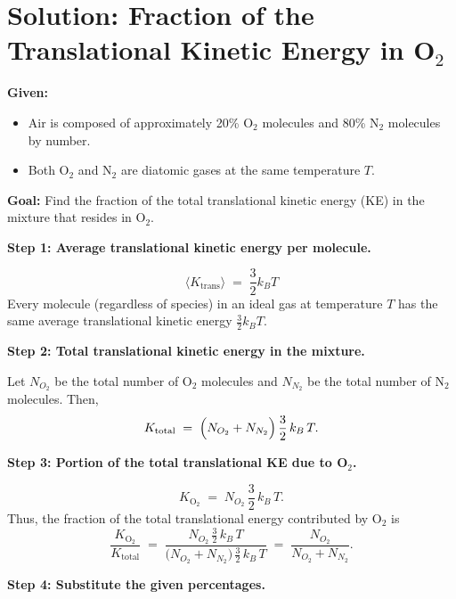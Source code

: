 \documentclass[12pt]{article}
\title{}
\author{Jerich Lee}
\date{\today}
\theoremstyle{definition} %
\theoremstyle{plain} %
\begin{document}
\maketitle

\section*{Solution: Fraction of the Translational Kinetic Energy in O$_2$}

\noindent
\textbf{Given:}
\begin{itemize}
    \item Air is composed of approximately 20\% O$_2$ molecules and 80\% N$_2$ molecules by number.
    \item Both O$_2$ and N$_2$ are diatomic gases at the same temperature $T$.
\end{itemize}

\noindent
\textbf{Goal:} Find the fraction of the total translational kinetic energy (KE) in the mixture that resides in O$_2$.

\vspace{1em}
\noindent
\textbf{Step 1: Average translational kinetic energy per molecule.}

\[
\langle K_\text{trans} \rangle \;=\; \frac{3}{2} k_B T
\]
Every molecule (regardless of species) in an ideal gas at temperature $T$ has the same average translational kinetic energy $\frac{3}{2} k_B T$.

\vspace{1em}
\noindent
\textbf{Step 2: Total translational kinetic energy in the mixture.}

Let $N_{O_2}$ be the total number of O$_2$ molecules and $N_{N_2}$ be the total number of N$_2$ molecules. Then,
\[
K_\text{total} \;=\; \Bigl(N_{O_2} + N_{N_2}\Bigr)\,\frac{3}{2}\,k_B\,T.
\]

\vspace{1em}
\noindent
\textbf{Step 3: Portion of the total translational KE due to O$_2$.}

\[
K_\text{O$_2$} \;=\; N_{O_2}\,\frac{3}{2}\,k_B\,T.
\]
Thus, the fraction of the total translational energy contributed by O$_2$ is
\[
\frac{K_\text{O$_2$}}{K_\text{total}} 
\;=\; 
\frac{N_{O_2}\,\frac{3}{2}\,k_B\,T}{\bigl(N_{O_2} + N_{N_2}\bigr)\,\frac{3}{2}\,k_B\,T} 
\;=\; 
\frac{N_{O_2}}{N_{O_2} + N_{N_2}}.
\]

\vspace{1em}
\noindent
\textbf{Step 4: Substitute the given percentages.}
\end{document}
